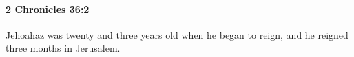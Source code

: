 
		\paragraph{2 Chronicles 36:2} %
			\label{2CHRONICLES-36-2}

			Jehoahaz was twenty and three years old when he began to reign, and he reigned three months in Jerusalem.


